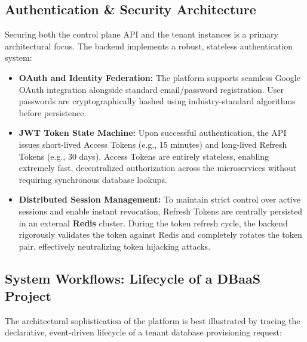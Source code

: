 \subsection{Authentication \& Security Architecture}

Securing both the control plane API and the tenant instances is a primary architectural focus. The backend implements a robust, stateless authentication system:

\begin{itemize}
    \item \textbf{OAuth and Identity Federation:} The platform supports seamless Google OAuth integration alongside standard email/password registration. User passwords are cryptographically hashed using industry-standard algorithms before persistence.
    \item \textbf{JWT Token State Machine:} Upon successful authentication, the API issues short-lived Access Tokens (e.g., 15 minutes) and long-lived Refresh Tokens (e.g., 30 days). Access Tokens are entirely stateless, enabling extremely fast, decentralized authorization across the microservices without requiring synchronous database lookups.
    \item \textbf{Distributed Session Management:} To maintain strict control over active sessions and enable instant revocation, Refresh Tokens are centrally persisted in an external \textbf{Redis} cluster. During the token refresh cycle, the backend rigorously validates the token against Redis and completely rotates the token pair, effectively neutralizing token hijacking attacks.
\end{itemize}



\subsection{System Workflows: Lifecycle of a DBaaS Project}

The architectural sophistication of the platform is best illustrated by tracing the declarative, event-driven lifecycle of a tenant database provisioning request:

